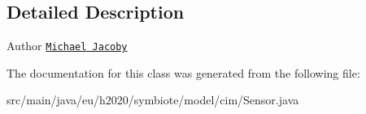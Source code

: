 \subsection{Detailed Description}
\begin{DoxyAuthor}{Author}
\href{mailto:michael.jacoby@iosb.fraunhofer.de}{\tt Michael Jacoby} 
\end{DoxyAuthor}


The documentation for this class was generated from the following file\+:\begin{DoxyCompactItemize}
\item 
src/main/java/eu/h2020/symbiote/model/cim/Sensor.\+java\end{DoxyCompactItemize}
